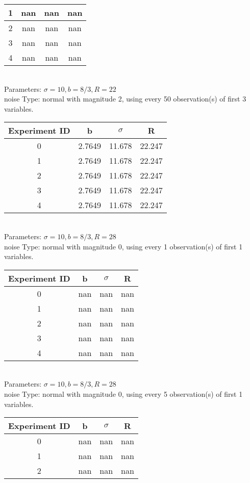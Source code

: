 \begin{multicols}{3}
\begin{tabular}{cccc}
 1 & nan & nan & nan\\ \hline 
 2 & nan & nan & nan\\ \hline 
 3 & nan & nan & nan\\ \hline 
 4 & nan & nan & nan\\ \hline 
 \end{tabular}\\
Parameters: $\sigma=10, b=8/3, R=22$\\
noise Type: normal with magnitude 2, using every 50 observation(s) of first 3 variables.\\
\begin{tabular}{cccc}
\hline Experiment ID & b & $\sigma$ & R \\ \hline 
0 & 2.7649 & 11.678 & 22.247\\ \hline 
 1 & 2.7649 & 11.678 & 22.247\\ \hline 
 2 & 2.7649 & 11.678 & 22.247\\ \hline 
 3 & 2.7649 & 11.678 & 22.247\\ \hline 
 4 & 2.7649 & 11.678 & 22.247\\ \hline 
 \end{tabular}\\
Parameters: $\sigma=10, b=8/3, R=28$\\
noise Type: normal with magnitude 0, using every 1 observation(s) of first 1 variables.\\
\begin{tabular}{cccc}
\hline Experiment ID & b & $\sigma$ & R \\ \hline 
0 & nan & nan & nan\\ \hline 
 1 & nan & nan & nan\\ \hline 
 2 & nan & nan & nan\\ \hline 
 3 & nan & nan & nan\\ \hline 
 4 & nan & nan & nan\\ \hline 
 \end{tabular}\\
Parameters: $\sigma=10, b=8/3, R=28$\\
noise Type: normal with magnitude 0, using every 5 observation(s) of first 1 variables.\\
\begin{tabular}{cccc}
\hline Experiment ID & b & $\sigma$ & R \\ \hline 
0 & nan & nan & nan\\ \hline 
 1 & nan & nan & nan\\ \hline 
 2 & nan & nan & nan\\ \hline 

\end{tabular}
\end{multicols}
